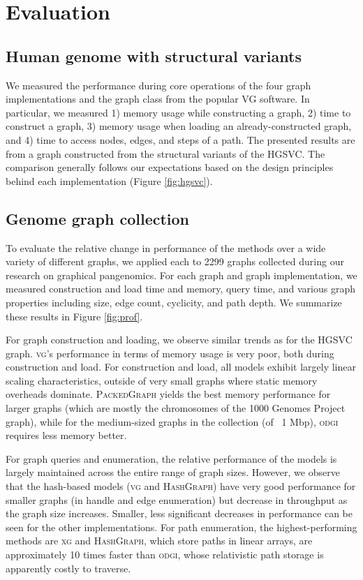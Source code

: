 \documentclass{article}
\begin{document}
\section{Evaluation}

\subsection{Human genome with structural variants}

We measured the performance during core operations of the four graph implementations and the graph class from the popular VG software.
In particular, we measured 1) memory usage while constructing a graph, 2) time to construct a graph, 3) memory usage when loading an already-constructed graph, and 4) time to access nodes, edges, and steps of a path.
The presented results are from a graph constructed from the structural variants of the HGSVC.
The comparison generally follows our expectations based on the design principles behind each implementation (Figure \ref{fig:hgsvc}).

\subsection{Genome graph collection}

To evaluate the relative change in performance of the methods over a wide variety of different graphs, we applied each to 2299 graphs collected during our research on graphical pangenomics.
For each graph and graph implementation, we measured construction and load time and memory, query time, and various graph properties including size, edge count, cyclicity, and path depth.
We summarize these results in Figure \ref{fig:prof}.

For graph construction and loading, we observe similar trends as for the HGSVC graph.
\textsc{vg}'s performance in terms of memory usage is very poor, both during construction and load.
For construction and load, all models exhibit largely linear scaling characteristics, outside of very small graphs where static memory overheads dominate.
\textsc{PackedGraph} yields the best memory performance for larger graphs (which are mostly the chromosomes of the 1000 Genomes Project graph), while for the medium-sized graphs in the collection (of ~1 Mbp), \textsc{odgi} requires less memory better.

For graph queries and enumeration, the relative performance of the models is largely maintained across the entire range of graph sizes.
However, we observe that the hash-based models (\textsc{vg} and \textsc{HashGraph}) have very good performance for smaller graphs (in handle and edge enumeration) but decrease in throughput as the graph size increases.
Smaller, less significant decreases in performance can be seen for the other implementations.
For path enumeration, the highest-performing methods are \textsc{xg} and \textsc{HashGraph}, which store paths in linear arrays, are approximately 10 times faster than \textsc{odgi}, whose relativistic path storage is apparently costly to traverse.
\end{document}
